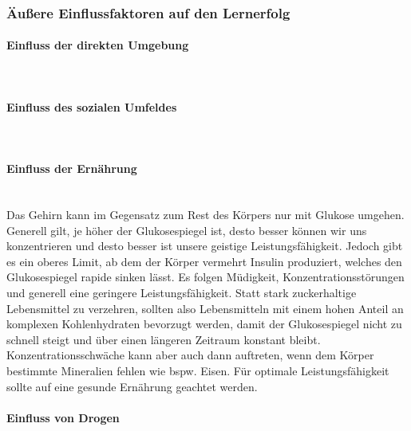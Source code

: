 \subsubsection{Äußere Einflussfaktoren auf den Lernerfolg}
\paragraph{Einfluss der direkten Umgebung}~\\
\paragraph{Einfluss des sozialen Umfeldes}~\\
\paragraph{Einfluss der Ernährung}~\\
Das Gehirn kann im Gegensatz zum Rest des Körpers nur mit Glukose umgehen. Generell gilt, je höher der Glukosespiegel ist, desto besser können wir uns konzentrieren und desto besser ist unsere geistige Leistungsfähigkeit. Jedoch gibt es ein oberes Limit, ab dem der Körper vermehrt Insulin produziert, welches den Glukosespiegel rapide sinken lässt. Es folgen Müdigkeit, Konzentrationsstörungen und generell eine geringere Leistungsfähigkeit. Statt stark zuckerhaltige Lebensmittel zu verzehren, sollten also Lebensmitteln mit einem hohen Anteil an komplexen Kohlenhydraten bevorzugt werden, damit der Glukosespiegel nicht zu schnell steigt und über einen längeren Zeitraum konstant bleibt.
Konzentrationsschwäche kann aber auch dann auftreten, wenn dem Körper bestimmte Mineralien fehlen wie bspw. Eisen. Für optimale Leistungsfähigkeit sollte auf eine gesunde Ernährung geachtet werden.
\paragraph{Einfluss von Drogen}~\\

